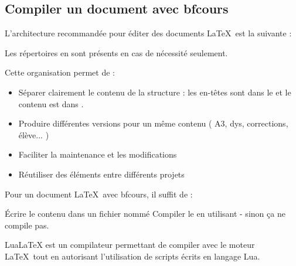 \subsection{Compiler un document avec bfcours}

\begin{Methode}

    L'architecture recommandée pour éditer des documents \LaTeX\ est la suivante : 
    \begin{tcbraster}[raster columns=3,blank]
        \begin{tcolorbox}[blank,raster multicolumn=2]

            Les répertoires en  sont présents en cas de nécessité seulement.
        \end{tcolorbox}
        \begin{tcolorbox}[blank] 
            Cette organisation permet de :
            \begin{itemize}[label=$\bullet$]
                \item Séparer clairement le contenu de la structure : les en-têtes sont dans le  et le contenu est dans .
                \item Produire différentes versions pour un même contenu ( A3, dys, corrections, élève... )
                \item Faciliter la maintenance et les modifications
                \item Réutiliser des éléments entre différents projets
            \end{itemize}
        \end{tcolorbox}
    \end{tcbraster}


    Pour  un document \LaTeX\ avec bfcours, il suffit de : 
    \begin{tcbenumerate}
        \tcbitem {} \'Ecrire le contenu dans un fichier nommé 
        \tcbitem {} Compiler le  en utilisant  - sinon ça ne compile pas. 
    \end{tcbenumerate}
\begin{Remarque}
    LuaLaTeX est un compilateur permettant de compiler avec le moteur \LaTeX\ tout en autorisant l'utilisation de scripts écrits en langage Lua. 


\end{Remarque}
\end{Methode}
